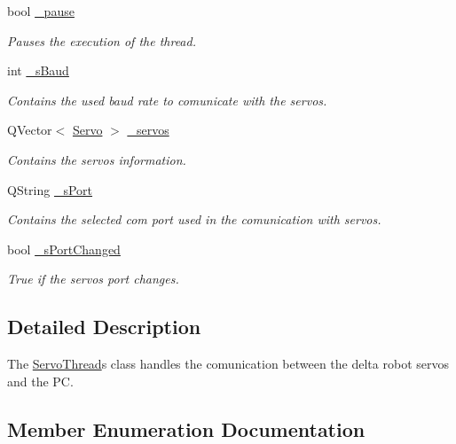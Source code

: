 \begin{DoxyCompactItemize}
bool \hyperlink{a00007_aaf2ef80e8e43518b75d20a5102970d2e}{\+\_\+pause}
\begin{DoxyCompactList}\small\item\em Pauses the execution of the thread. \end{DoxyCompactList}\item 
int \hyperlink{a00007_a5b9a41b9e271275b914affb0a845a2ee}{\+\_\+s\+Baud}
\begin{DoxyCompactList}\small\item\em Contains the used baud rate to comunicate with the servos. \end{DoxyCompactList}\item 
Q\+Vector$<$ \hyperlink{a00006}{Servo} $>$ \hyperlink{a00007_a1ac6662fe6d198b5971ae0ffa7ddfcfd}{\+\_\+servos}
\begin{DoxyCompactList}\small\item\em Contains the servos information. \end{DoxyCompactList}\item 
Q\+String \hyperlink{a00007_ac9a614aa1518efb49b0a06636bd1bdbf}{\+\_\+s\+Port}
\begin{DoxyCompactList}\small\item\em Contains the selected com port used in the comunication with servos. \end{DoxyCompactList}\item 
bool \hyperlink{a00007_a6e803432db01b10ed975132315280fd3}{\+\_\+s\+Port\+Changed}
\begin{DoxyCompactList}\small\item\em True if the servos port changes. \end{DoxyCompactList}\end{DoxyCompactItemize}


\subsection{Detailed Description}
The \hyperlink{a00007}{Servo\+Thread}\textquotesingle{}s class handles the comunication between the delta robot servos and the P\+C. 



\subsection{Member Enumeration Documentation}
\hypertarget{a00007_a8d581034e60792a9995d44065f6140a5}{}
